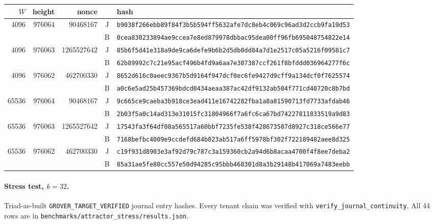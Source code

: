 \documentclass[11pt]{article}
\theoremstyle{definition}
\newcommand{\code}[1]{\texttt{\small #1}}
\newcommand{\hash}[1]{\texttt{\scriptsize #1}}
\begin{document}
\begin{center}\footnotesize
\begin{tabular}{rrrcl}\toprule
$W$&height&nonce&&hash\\\midrule
4096&976064&90468167&J&\hash{b9038f266ebb89f84f3b5b594ff5632afe7dc8eb4c069c96ad3d2ccb9fa19d53}\\
&&&B&\hash{0cea830233894ae9ccea7e8ed879978dbbac95dea00ff96fb695048754822e14}\\
4096&976063&1265527642&J&\hash{85b6f5d41e318a9de9ca6defe9b6b2d5db0dd84a7d1e2517c05a5216f09581c7}\\
&&&B&\hash{62b89992c7c21e95acf496b4fd9a6aa7e307387ccf261f8bfddd036964277f6c}\\
4096&976062&462700330&J&\hash{8652d616c0aeec9367b5d9164f947dcf0ec6fe9427d9cff9a134dcf0f7625574}\\
&&&B&\hash{a0c6e5ad25b457369bdcd0434aeaa387ac42df9132ab504f771cd40720c8b7bd}\\
65536&976064&90468167&J&\hash{9c665ce9caeba3b918ce3ead411e16742282fba1a8a81590713fd7733afdab46}\\
&&&B&\hash{2b03f5a0c14ad313e31015fc31804966f7a6fc6ca67bd74227811833519a9d83}\\
65536&976063&1265527642&J&\hash{17543fa3f64df08a565517a60bbf7235fe538f428673507d8927c318ce566e77}\\
&&&B&\hash{7168befbc4009e9ccdefd684b023ab517a6ff5978bf302f722189482aee8d325}\\
65536&976062&462700330&J&\hash{c19f931d8903e3af92d79c787c3a159360cb2a94d6b8acaa4700f4f8ee7deba2}\\
&&&B&\hash{85a31ae5fe80cc557e50d94285c95bbb468301d8a3b29148b417069a7483eebb}\\\bottomrule
\end{tabular}
\end{center}

\paragraph{Stress test, $k=32$.} Triad-as-built \code{GROVER\_TARGET\_VERIFIED} journal entry hashes. Every tenant chain
was verified with \code{verify\_journal\_continuity}. All 44 rows are in \code{benchmarks/attractor\_stress/results.json}.
\end{document}
